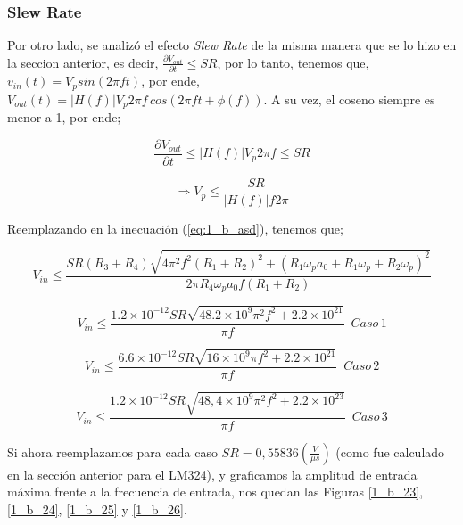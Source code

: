 \subsubsection{Slew Rate}

Por otro lado, se analizó el efecto \emph{Slew Rate }de la misma manera
que se lo hizo en la seccion anterior, es decir, $\frac{\partial V_{out}}{\partial t}\leq SR$,
por lo tanto, tenemos que, $v_{in}(t)=V_{p}sin(2\pi ft)$, por ende,
$V_{out}(t)=\left|H(f)\right|V_{p}2\pi f\,cos(2\pi ft+\phi(f))$.
A su vez, el coseno siempre es menor a 1, por ende;

\[
\frac{\partial V_{out}}{\partial t}\leq\left|H(f)\right|V_{p}2\pi f\leq SR
\]

\begin{equation}
\Rightarrow V_{p}\leq\frac{SR}{\left|H(f)\right|f2\pi}\label{eq:1_b_asd}
\end{equation}

Reemplazando en la inecuación (\ref{eq:1_b_asd}), tenemos que;

\[
V_{in}\leq\frac{SR\left(R_{3}+R_{4}\right)\sqrt{4\pi^{2}f^{2}\left(R_{1}+R_{2}\right)^{2}+\left(R_{1}\omega_{p}a_{0}+R_{1}\omega_{p}+R_{2}\omega_{p}\right)^{2}}}{2\pi R_{4}\omega_{p}a_{0}f\left(R_{1}+R_{2}\right)}
\]

\[
V_{in}\leq\frac{1.2\times10^{-12}SR\sqrt{48.2\times10^{9}\pi^{2}f^{2}+2.2\times10^{21}}}{\pi f}\,\,\,Caso\,1
\]

\[
V_{in}\leq\frac{6.6\times10^{-12}SR\sqrt{16\times10^{9}\pi f^{2}+2.2\times10^{21}}}{\pi f}\,\,\,Caso\,2
\]

\[
V_{in}\leq\frac{1.2\times10^{-12}SR\sqrt{48,4\times10^{9}\pi^{2}f^{2}+2.2\times10^{23}}}{\pi f}\,\,\,Caso\,3
\]

Si ahora reemplazamos para cada caso $SR=0,55836\left(\frac{V}{\mu s}\right)$
(como fue calculado en la sección anterior para el LM324), y graficamos
la amplitud de entrada máxima frente a la frecuencia de entrada, nos
quedan las Figuras \ref{1_b_23}, \ref{1_b_24}, \ref{1_b_25} y \ref{1_b_26}.

